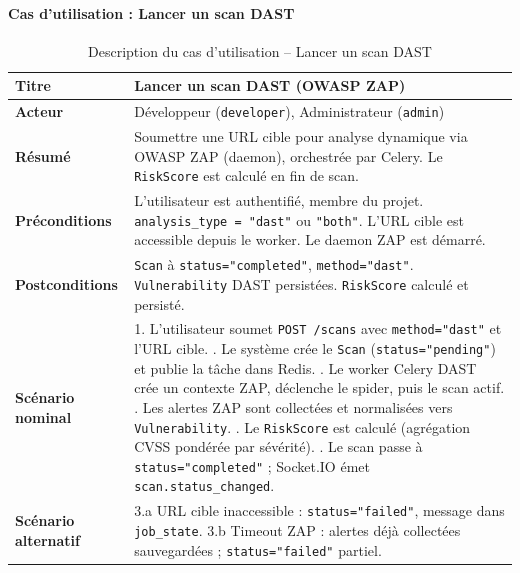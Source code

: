 \paragraph{Cas d'utilisation : Lancer un scan DAST}
\begin{table}[H]
\centering
\caption{Description du cas d'utilisation -- Lancer un scan DAST}
\label{tab:uc-dast}
\small
\renewcommand{\arraystretch}{1.3}
\begin{tabularx}{\textwidth}{>{\bfseries}p{3.5cm} X}
\hline
Titre & Lancer un scan DAST (OWASP ZAP) \\
\hline
Acteur & Développeur (\texttt{developer}), Administrateur (\texttt{admin}) \\
\hline
Résumé & Soumettre une URL cible pour analyse dynamique via OWASP ZAP (daemon), orchestrée par Celery. Le \texttt{RiskScore} est calculé en fin de scan. \\
\hline
Préconditions & L'utilisateur est authentifié, membre du projet. \texttt{analysis\_type = "dast"} ou \texttt{"both"}. L'URL cible est accessible depuis le worker. Le daemon ZAP est démarré. \\
\hline
Postconditions & \texttt{Scan} à \texttt{status="completed"}, \texttt{method="dast"}. \texttt{Vulnerability} DAST persistées. \texttt{RiskScore} calculé et persisté. \\
\hline
Scénario nominal &
1. L'utilisateur soumet \texttt{POST /scans} avec \texttt{method="dast"} et l'URL cible. \newline
2. Le système crée le \texttt{Scan} (\texttt{status="pending"}) et publie la tâche dans Redis. \newline
3. Le worker Celery DAST crée un contexte ZAP, déclenche le spider, puis le scan actif. \newline
4. Les alertes ZAP sont collectées et normalisées vers \texttt{Vulnerability}. \newline
5. Le \texttt{RiskScore} est calculé (agrégation CVSS pondérée par sévérité). \newline
6. Le scan passe à \texttt{status="completed"} ; Socket.IO émet \texttt{scan.status\_changed}. \\
\hline
Scénario alternatif &
3.a URL cible inaccessible : \texttt{status="failed"}, message dans \texttt{job\_state}. \newline
3.b Timeout ZAP : alertes déjà collectées sauvegardées ; \texttt{status="failed"} partiel. \\
\hline
\end{tabularx}
\end{table}

